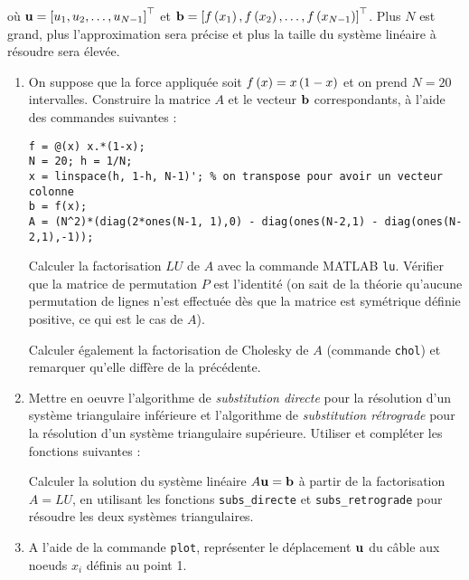 où $\mathbf{u} = \left[u_{1}, u_{2}, \dots, u_{N-1}\right]^{\top}$ et $\mathbf{b} = \left[f \left(x_{1}\right), f \left(x_{2}\right), \dots, f \left(x_{N-1}\right)\right]^{\top}$.
Plus $N$ est grand, plus l'approximation sera précise et plus la taille du système linéaire à résoudre sera élevée.

\begin{enumerate}[label=\alph*)]
  \item On suppose que la force appliquée soit $f \left(x\right) = x \left(1 - x\right)$ et on prend $N = 20$ intervalles.
        Construire la matrice $A$ et le vecteur $\mathbf{b}$ correspondants, à l'aide des commandes suivantes :

\begin{verbatim}
f = @(x) x.*(1-x);
N = 20; h = 1/N;
x = linspace(h, 1-h, N-1)'; % on transpose pour avoir un vecteur colonne
b = f(x);
A = (N^2)*(diag(2*ones(N-1, 1),0) - diag(ones(N-2,1) - diag(ones(N-2,1),-1));
\end{verbatim}
        
        Calculer la factorisation $LU$ de $A$ avec la commande \textsc{MATLAB} \texttt{lu}.
        Vérifier que la matrice de permutation $P$ est l'identité (on sait de la théorie qu'aucune permutation de lignes n'est effectuée dès que la matrice est symétrique définie positive, ce qui est le cas de $A$).
        
        Calculer également la factorisation de Cholesky de $A$ (commande \texttt{chol}) et remarquer qu'elle diffère de la précédente.
        
        
  \item Mettre en oeuvre l'algorithme de \textit{substitution directe} pour la résolution d'un système triangulaire inférieure et l'algorithme de \textit{substitution rétrograde} pour la résolution d'un système triangulaire supérieure. Utiliser et compléter les fonctions suivantes :
  
        

        
  
        Calculer la solution du système linéaire $A \mathbf{u} = \mathbf{b}$ à partir de la factorisation $A = LU$, en utilisant les fonctions \texttt{subs\_directe} et \texttt{subs\_retrograde} pour résoudre les deux systèmes triangulaires.
  
  
  \item A l'aide de la commande \texttt{plot}, représenter le déplacement $\mathbf{u}$ du câble aux noeuds $x_{i}$ définis au point 1.
  

\end{enumerate}

